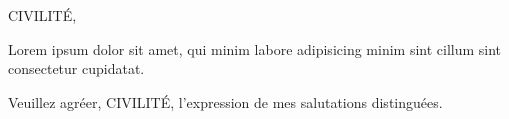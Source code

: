 \documentclass[11pt]{lettre}
\begin{document}
\begin{letter}{
    \prenomDestinataire \space \nomDestinataire\\
    \addressDestinataire\\
    \cpDestinataire \space \villeDestinataire
  }
\date{le \today} 
\lieu{\lieuEmission}
\name{\prenomEmmeteur \space \nomEmmeteur}
\signature{
  \lieuEmission, le \today\\
  \vspace{2cm}
  \prenomEmmeteur \space \nomEmmeteur
}
\address{\prenomEmmeteur \space \nomEmmeteur,\\ \addressEmmeteur, \\ \cpEmmeteur \space \villeEmmeteur}
\telephone{\telephoneEmmeteur}
\nofax
\email{\emailEmmeteur}



\opening{CIVILITÉ,}

Lorem ipsum dolor sit amet, qui minim labore adipisicing minim
sint cillum sint consectetur cupidatat.

\closing{
  Veuillez agréer, CIVILITÉ, l'expression de mes salutations distinguées.
}


\end{letter}
\end{document}
